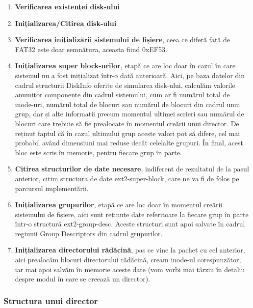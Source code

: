 \begin{enumerate}
  \item \textbf{Verificarea existenței disk-ului}

  \item \textbf{Inițializarea/Citirea disk-ului}

  \item \textbf{Verificarea inițializării sistemului de fișiere}, ceea ce diferă față de FAT32 este doar semnătura, aceasta fiind 0xEF53.

  \item \textbf{Inițializarea super block-urilor}, etapă ce are loc doar în cazul în care sistemul nu a fost inițializat într-o dată anterioară. Aici, pe baza datelor din cadrul structurii DiskInfo oferite de simularea disk-ului, calculăm valorile anumitor componente din cadrul sistemului, cum ar fi numărul total de inode-uri, numărul total de blocuri sau numărul de blocuri din cadrul unui grup, dar și alte informații precum momentul ultimei scrieri sau numărul de blocuri care trebuie să fie prealocate în momentul creării unui director. De reținut faptul că în cazul ultimului grup aceste valori pot să difere, cel mai probabil având dimensiuni mai reduse decât celelalte grupuri. În final, acest bloc este scris în memorie, pentru fiecare grup în parte.

 \item \textbf{Citirea structurilor de date necesare}, indiferent de rezultatul de la pasul anterior, citim structura de date ext2-super-block, care ne va fi de folos pe parcursul implementării.
 \item \textbf{Inițializarea grupurilor}, etapă ce are loc doar în momentul creării sistemului de fișiere, aici sunt reținute date referitoare la fiecare grup în parte într-o structură ext2-group-desc. Aceste structuri sunt apoi salvate în cadrul regiunii Group Descriptors din cadrul grupurilor.

\item \textbf{Inițializarea directorului rădăcină}, pas ce vine la pachet cu cel anterior, aici prealocăm blocuri directorului rădăcină, cream inode-ul corespunzător, iar mai apoi salvăm în memorie aceste date (vom vorbi mai târziu în detaliu despre modul în care se creează un director).
  
\end{enumerate}

\subsubsection{Structura unui director}

